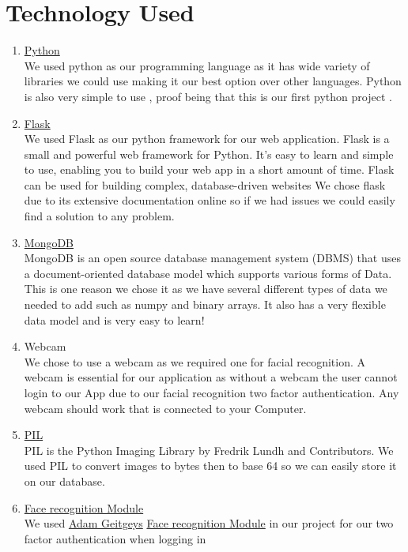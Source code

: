 \documentclass{article}
\begin{document}
\newpage

\section{Technology Used}
\begin{enumerate}
\item \href{https://www.python.org/downloads/}{Python}\cite{python} \\
We used python as our programming language as it has wide variety of libraries we could use making it our best option over other languages. Python is also very simple to use , proof being that this is our first python project .
\item \href{https://flask.palletsprojects.com/en/1.1.x/}{Flask} \cite{flask} \\
We used Flask as our python framework for our web application. 
Flask is a small and powerful web framework for Python. 
It's easy to learn and simple to use, enabling you to build your web app in a short amount of time. Flask can be used for building complex, database-driven websites
We chose flask due to its extensive documentation online so if we had issues we could easily find a solution to any problem.
\item \href{https://www.mongodb.com/}{MongoDB} \cite{mongodb} \\
MongoDB is an open source database management system (DBMS) that uses a document-oriented database model which supports various forms of 
Data. This is one reason we chose it as we have several different types of data we needed to add such as numpy and binary arrays. It  also has  a very flexible data model and is very easy to learn!

\item Webcam \\	
We chose to use a webcam as we required one for facial recognition.
A webcam is essential for our application as without a webcam the user cannot login to our App due to our facial recognition two factor authentication. 
Any webcam should work that is connected to your Computer.

\item \href{https://pillow.readthedocs.io/en/stable/}{PIL}  \cite{PIL} \\
PIL is the Python Imaging Library by Fredrik Lundh and Contributors.
We used PIL to convert images to bytes then to base 64 so we can easily store it on our database.

\item \href{https://github.com/ageitgey/face_recognition}{Face recognition Module} \cite{ageitgey} \\
We used \href{https://github.com/ageitgey}{Adam Geitgeys}  \cite{ageitgey} \href{https://github.com/ageitgey/face_recognition}{Face recognition Module} in our project for our two factor authentication when logging in


\end{enumerate}
\end{document}

